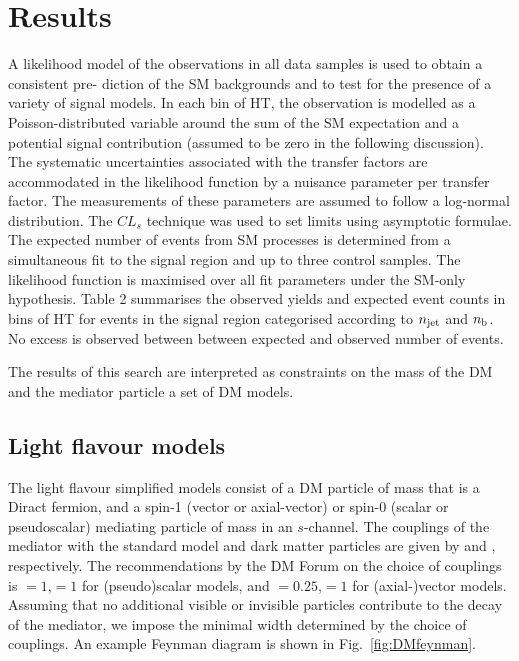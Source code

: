 \section{Results} \label{sec:darkmatter}

A likelihood model of the observations in all data samples is used to obtain a consistent pre-
diction of the SM backgrounds and to test for the presence of a variety of signal models.
In each bin of HT, the observation is modelled as a Poisson-distributed variable around the sum
of the SM expectation and a potential signal contribution (assumed to be zero in the following
discussion).  The systematic uncertainties associated with the transfer factors are accommodated 
in the likelihood function by a nuisance parameter per transfer factor. 
The measurements of these parameters are assumed to follow a log-normal
distribution. The $CL_s$ technique was used to set limits using asymptotic formulae.
The expected number of events from SM processes is determined from a simultaneous fit to
the signal region and up to three control samples. The likelihood function is maximised over
all fit parameters under the SM-only hypothesis. Table 2 summarises the observed yields and
expected event counts in bins of HT for events in the signal region categorised according to $n_{\rm jet}$ 
 and $n_{\rm b}$. No excess is observed between between expected and observed number of events.

The results of this search are interpreted as constraints on the mass of the DM and the mediator particle 
a set of DM models.


\subsection{Light flavour models} \label{sec:dm_lightjet}

The light flavour simplified models consist of a DM particle \pchi of mass
\mchi that is a Diract fermion, and a spin-1 (vector or axial-vector) or spin-0
(scalar or pseudoscalar) mediating particle \pphi of mass \mphi in an
$s$-channel. The couplings of the mediator with the standard model and dark
matter particles are given by \gsm and \gdm, respectively. The recommendations
by the DM Forum on the choice of couplings is \gsm$=1$,\gdm$=1$ for
(pseudo)scalar models, and \gsm$=0.25$,\gdm$=1$ for (axial-)vector models.
Assuming that no additional visible or invisible particles contribute to the decay 
of the mediator, we impose the minimal width determined by the choice of couplings. 
An example Feynman diagram is shown in Fig.~\ref{fig:DMfeynman}.



